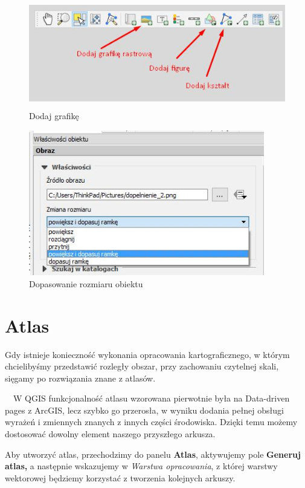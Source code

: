 \documentclass[12pt,a4paper]{book}
\begin{document}
\begin{figure}[ht]
	\centering
	\includegraphics[width=12.598cm,height=4.748cm]{008-grafiki.jpg}
	\caption{Dodaj grafikę}
\end{figure}



\begin{center}
\begin{figure}
\includegraphics[width=10.301cm,height=6.339cm]{008-dopasowanie.jpg}
\caption{Dopasowanie rozmiaru obiektu}
\end{figure}
\end{center}
\section{Atlas}
Gdy istnieje konieczność wykonania opracowania kartograficznego, w którym chcielibyśmy przedstawić rozległy obszar, przy zachowaniu czytelnej skali, sięgamy po rozwiązania znane z atlasów.

\ \ W QGIS funkcjonalność atlasu wzorowana pierwotnie była na {\textquotedbl}Data-driven pages{\textquotedbl} z ArcGIS, lecz szybko go przerosła, w wyniku dodania pełnej obsługi wyrażeń i zmiennych znanych z innych części środowiska. Dzięki temu możemy dostosować dowolny element naszego przyszłego arkusza.

Aby utworzyć atlas, przechodzimy do panelu \textbf{Atlas}, aktywujemy pole \textbf{Generuj atlas,} a następnie wskazujemy w \textit{Warstwa opracowania}, z której warstwy wektorowej będziemy korzystać z tworzenia kolejnych arkuszy.
\end{document}
